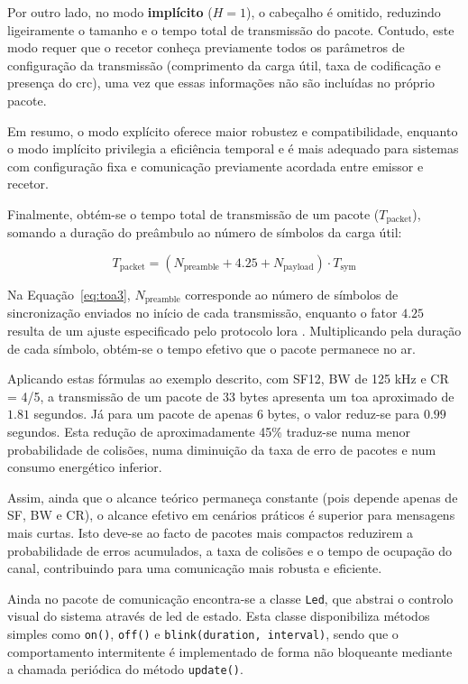Por outro lado, no modo \textbf{implícito} ($H = 1$), o cabeçalho é omitido, reduzindo ligeiramente o tamanho e o tempo total de transmissão do pacote. Contudo, este modo requer que o recetor conheça previamente todos os parâmetros de configuração da transmissão (comprimento da carga útil, taxa de codificação e presença do \gls{crc}), uma vez que essas informações não são incluídas no próprio pacote.  

Em resumo, o modo explícito oferece maior robustez e compatibilidade, enquanto o modo implícito privilegia a eficiência temporal e é mais adequado para sistemas com configuração fixa e comunicação previamente acordada entre emissor e recetor.

Finalmente, obtém-se o tempo total de transmissão de um pacote ($T_{\text{packet}}$), somando a duração do preâmbulo ao número de símbolos da carga útil:

\begin{equation}
T_{\text{packet}} = \left( N_{\text{preamble}} + 4.25 + N_{\text{payload}} \right) \cdot T_{\text{sym}}
\label{eq:toa3}
\end{equation}

Na Equação~\ref{eq:toa3}, $N_{\text{preamble}}$ corresponde ao número de símbolos de sincronização enviados no início de cada transmissão, enquanto o fator $4.25$ resulta de um ajuste especificado pelo protocolo \gls{lora} \cite{ttn-lora-phy-format}. Multiplicando pela duração de cada símbolo, obtém-se o tempo efetivo que o pacote permanece no ar.  

Aplicando estas fórmulas ao exemplo descrito, com SF12, BW de 125 kHz e CR = 4/5, a transmissão de um pacote de 33 bytes apresenta um \gls{toa} aproximado de $1.81$ segundos. Já para um pacote de apenas 6 bytes, o valor reduz-se para $0.99$ segundos. Esta redução de aproximadamente 45\% traduz-se numa menor probabilidade de colisões, numa diminuição da taxa de erro de pacotes e num consumo energético inferior.  

Assim, ainda que o alcance teórico permaneça constante (pois depende apenas de SF, BW e CR), o alcance efetivo em cenários práticos é superior para mensagens mais curtas. Isto deve-se ao facto de pacotes mais compactos reduzirem a probabilidade de erros acumulados, a taxa de colisões e o tempo de ocupação do canal, contribuindo para uma comunicação mais robusta e eficiente.

Ainda no pacote de comunicação encontra-se a classe \texttt{Led}, que abstrai o controlo visual do sistema através de \gls{led} de estado. Esta classe disponibiliza métodos simples como \texttt{on()}, \texttt{off()} e \texttt{blink(duration, interval)}, sendo que o comportamento intermitente é implementado de forma não bloqueante mediante a chamada periódica do método \texttt{update()}.  


